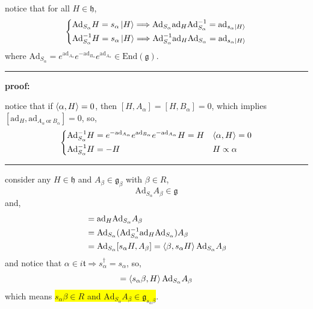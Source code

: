 \begin{itemize}
\begin{tcolorbox}[title=proof:]
		notice that for all $H \in \mathfrak{h}$,
		\begin{equation}
			\begin{dcases}
				\mathrm{Ad}_{S_\alpha} H = s_\alpha \ket{H} \Longrightarrow \mathrm{Ad}_{S_\alpha} \mathrm{ad}_H \mathrm{Ad}_{S_\alpha}^{- 1} = \mathrm{ad}_{s_\alpha \ket{H}} \\
				\mathrm{Ad}_{S_\alpha}^{- 1} H = s_\alpha \ket{H} \Longrightarrow \mathrm{Ad}_{S_\alpha}^{- 1} \mathrm{ad}_H \mathrm{Ad}_{S_\alpha} = \mathrm{ad}_{s_\alpha \ket{H}}
			\end{dcases}
		\end{equation}
		where $\mathrm{Ad}_{S_\alpha} = e^{\mathrm{ad}_{A_\alpha}} e^{- \mathrm{ad}_{B_\alpha}} e^{\mathrm{ad}_{A_\alpha}} \in \mathrm{End}(\mathfrak{g})$.
		
		\noindent\rule[0.5ex]{\linewidth}{0.5pt} %
		
		\textbf{proof:}
		
		notice that if $\braket{\alpha, H} = 0$, then $[H, A_\alpha] = [H, B_\alpha] = 0$, which implies $[\mathrm{ad}_H, \mathrm{ad}_{A_\alpha \ \text{or} \ B_\alpha}] = 0$, so,
		\begin{equation}
			\begin{dcases}
				\mathrm{Ad}_{S_\alpha}^{- 1} H = e^{- \mathrm{ad}_{A_\alpha}} e^{\mathrm{ad}_{B_\alpha}} e^{- \mathrm{ad}_{A_\alpha}} H = H & \braket{\alpha, H} = 0 \\
				\mathrm{Ad}_{S_\alpha}^{- 1} H = - H & H \propto \alpha
			\end{dcases}
		\end{equation}
		
		\noindent\rule[0.5ex]{\linewidth}{0.5pt} %
		
		consider any $H \in \mathfrak{h}$ and $A_\beta \in \mathfrak{g}_\beta$ with $\beta \in R$,
		\begin{equation}
			\mathrm{Ad}_{S_\alpha} A_\beta \in \mathfrak{g}
		\end{equation}
		and,
		\begin{align}
			[H, \mathrm{Ad}_{S_\alpha} A_\beta] &= \mathrm{ad}_H \mathrm{Ad}_{S_\alpha} A_\beta \notag \\
			&= \mathrm{Ad}_{S_\alpha} (\mathrm{Ad}_{S_\alpha}^{- 1} \mathrm{ad}_H \mathrm{Ad}_{S_\alpha}) A_\beta \notag \\
			&= \mathrm{Ad}_{S_\alpha} [s_\alpha H, A_\beta] = \braket{\beta, s_\alpha H} \mathrm{Ad}_{S_\alpha} A_\beta
		\end{align}
		and notice that $\alpha \in i \mathfrak{t} \Longrightarrow s_\alpha^\dag = s_\alpha$, so,
		\begin{equation}
			[H, \mathrm{Ad}_{S_\alpha} A_\beta] = \braket{s_\alpha \beta, H} \mathrm{Ad}_{S_\alpha} A_\beta
		\end{equation}
		which means \colorbox{yellow}{$s_\alpha \beta \in R$ and $\mathrm{Ad}_{S_\alpha} A_\beta \in \mathfrak{g}_{s_\alpha \beta}$}.
	\end{tcolorbox}
	

\end{itemize}
